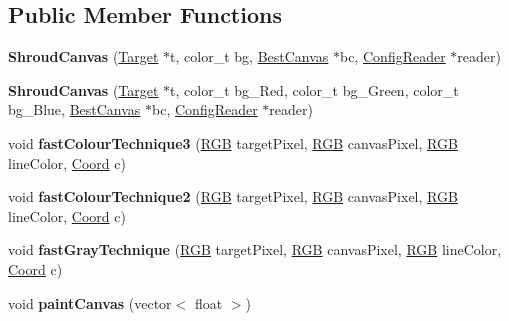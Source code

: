 \subsection*{Public Member Functions}
\begin{DoxyCompactItemize}
\item 
\hypertarget{classShroudCanvas_af61ed840d4483e18098eaadae9240282}{}\label{classShroudCanvas_af61ed840d4483e18098eaadae9240282} 
{\bfseries Shroud\+Canvas} (\hyperlink{classTarget}{Target} $\ast$t, color\+\_\+t bg, \hyperlink{classBestCanvas}{Best\+Canvas} $\ast$bc, \hyperlink{classConfigReader}{Config\+Reader} $\ast$reader)
\item 
\hypertarget{classShroudCanvas_a7723ea991bc0b77b24c9480be58c0728}{}\label{classShroudCanvas_a7723ea991bc0b77b24c9480be58c0728} 
{\bfseries Shroud\+Canvas} (\hyperlink{classTarget}{Target} $\ast$t, color\+\_\+t bg\+\_\+\+Red, color\+\_\+t bg\+\_\+\+Green, color\+\_\+t bg\+\_\+\+Blue, \hyperlink{classBestCanvas}{Best\+Canvas} $\ast$bc, \hyperlink{classConfigReader}{Config\+Reader} $\ast$reader)
\item 
\hypertarget{classShroudCanvas_a0b43672515fb0e4119e907fc97682d32}{}\label{classShroudCanvas_a0b43672515fb0e4119e907fc97682d32} 
void {\bfseries fast\+Colour\+Technique3} (\hyperlink{structRGB}{R\+GB} target\+Pixel, \hyperlink{structRGB}{R\+GB} canvas\+Pixel, \hyperlink{structRGB}{R\+GB} line\+Color, \hyperlink{structCoord}{Coord} c)
\item 
\hypertarget{classShroudCanvas_abab815d6a5f9e283f96386e5436bb994}{}\label{classShroudCanvas_abab815d6a5f9e283f96386e5436bb994} 
void {\bfseries fast\+Colour\+Technique2} (\hyperlink{structRGB}{R\+GB} target\+Pixel, \hyperlink{structRGB}{R\+GB} canvas\+Pixel, \hyperlink{structRGB}{R\+GB} line\+Color, \hyperlink{structCoord}{Coord} c)
\item 
\hypertarget{classShroudCanvas_ade49131d9be44f62153833ef2a276210}{}\label{classShroudCanvas_ade49131d9be44f62153833ef2a276210} 
void {\bfseries fast\+Gray\+Technique} (\hyperlink{structRGB}{R\+GB} target\+Pixel, \hyperlink{structRGB}{R\+GB} canvas\+Pixel, \hyperlink{structRGB}{R\+GB} line\+Color, \hyperlink{structCoord}{Coord} c)
\item 
\hypertarget{classShroudCanvas_ab0962bd430ae1fdc9e61b487e45a4fa1}{}\label{classShroudCanvas_ab0962bd430ae1fdc9e61b487e45a4fa1} 
void {\bfseries paint\+Canvas} (vector$<$ float $>$)
\item 
\hypertarget{classShroudCanvas_af90fc7e9d58b8089ffb5ba8ece8c15df}{}\label{classShroudCanvas_af90fc7e9d58b8089ffb5ba8ece8c15df} 

\end{DoxyCompactItemize}
